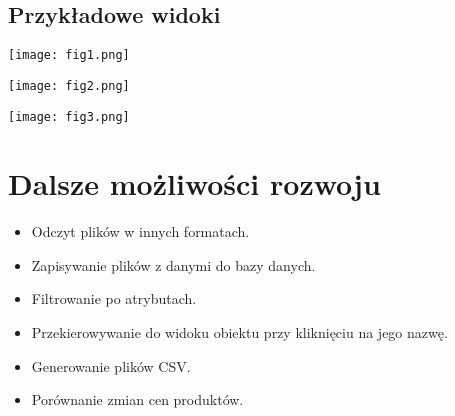 \documentclass[a4paper,11pt]{article}
\begin{document}
\subsection{Przykładowe widoki}
\begin{center}
    \texttt{[image: fig1.png]}
\end{center}
\begin{center}
    \texttt{[image: fig2.png]}
\end{center}
\begin{center}
    \texttt{[image: fig3.png]}
\end{center}





\section{Dalsze możliwości rozwoju}
\begin{itemize}
    \item Odczyt plików w innych formatach.
    \item Zapisywanie plików z danymi do bazy danych.
    \item Filtrowanie po atrybutach.
    \item Przekierowywanie do widoku obiektu przy kliknięciu na jego nazwę.
    \item Generowanie plików CSV.
    \item Porównanie zmian cen produktów.
\end{itemize}
\end{document}
